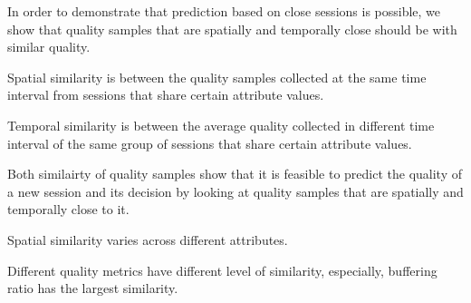In order to demonstrate that prediction based on close sessions is possible, we show that quality samples that are spatially and temporally close should be with similar quality. 

 Spatial similarity is between the quality samples collected at the same time interval from sessions that share certain attribute values. 

 Temporal similarity is between the average quality collected in different time interval of the same group of sessions that share certain attribute values. 

 
\begin{packedenumerate}
	\item Both similairty of quality samples show that it is feasible to predict the quality of a new session and its decision by looking at quality samples that are spatially and temporally close to it.
	\item Spatial similarity varies across different attributes.
	\item Different quality metrics have different level of similarity, especially, buffering ratio has the largest similarity.
\end{packedenumerate}

